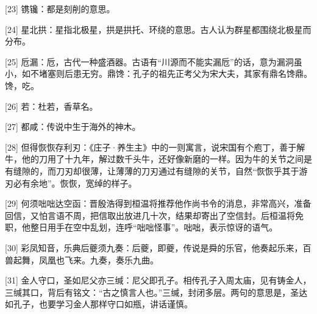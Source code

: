 \documentclass[12pt,UTF8]{ctexbook}
\begin{document}
[23] 镌镵：都是刻削的意思。

[24] 星北拱：星指北极星，拱是拱托、环绕的意思。古人认为群星都围绕北极星而分布。

[25] 卮漏：卮，古代一种盛酒器。古语有“川源而不能实漏卮”的话，意为漏洞虽小，如不堵塞则后患无穷。鼎馋：孔子的祖先正考父为宋大夫，其家有鼎名馋鼎。馋，吃。

[26] 若：杜若，香草名。

[27] 都咸：传说中生于海外的神木。

[28] 但得恢恢存利刃：《庄子·养生主》中的一则寓言，说宋国有个庖丁，善于解牛，他的刀用了十九年，解过数千头牛，还好像新磨的一样。因为牛的关节之间是有缝隙的，而刀刃却很薄，让薄薄的刀刃通过有缝隙的关节，自然“恢恢乎其于游刃必有余地”。恢恢，宽绰的样子。

[29] 何须咄咄达空函：晋殷浩得到桓温将推荐他作尚书令的消息，非常高兴，准备回信，又怕言语不周，把信取出放进几十次，结果却寄出了空信封。后桓温将免职，他整日用手在空中乱划，连呼“咄咄怪事”。咄咄，表示惊讶的语气。

[30] 彩凤知音，乐典后夔须九奏：后夔，即夔，传说是舜的乐官，他奏起乐来，百兽起舞，凤凰也飞来。九奏，奏乐九曲。

[31] 金人守口，圣如尼父亦三缄：尼父即孔子。相传孔子入周太庙，见有铸金人，三缄其口，背后有铭文：“古之慎言人也。”三缄，封闭多层。两句的意思是，圣达如孔子，也要学习金人那样守口如瓶，讲话谨慎。

\backmatter
\end{document}
